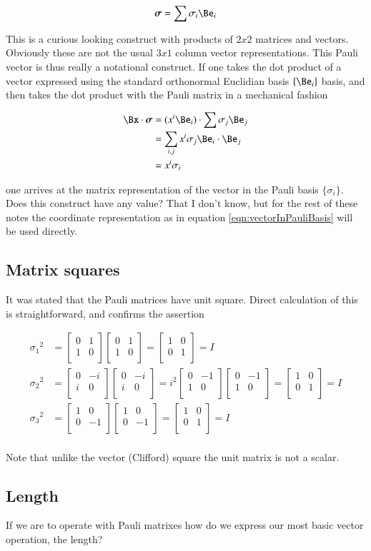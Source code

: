 \documentclass{article}
\newcommand{\PauliI}[0]{
\begin{bmatrix}
1 & 0 \\
0 & 1 \\
\end{bmatrix}
}
\newcommand{\PauliX}[0]{
\begin{bmatrix}
0 & 1 \\
1 & 0 \\
\end{bmatrix}
}
\newcommand{\PauliY}[0]{
\begin{bmatrix}
0 & -i \\
i & 0 \\
\end{bmatrix}
}
\newcommand{\PauliYNoI}[0]{
\begin{bmatrix}
0 & -1 \\
1 & 0 \\
\end{bmatrix}
}
\newcommand{\PauliZ}[0]{
\begin{bmatrix}
1 & 0 \\
0 & -1 \\
\end{bmatrix}
}
\begin{document}
\begin{align*}
\Bsigma = \sum \sigma_i \Be_i
\end{align*}

This is a curious looking construct with products of $2 x 2$ matrices and  vectors.  Obviously these are not the usual $3 x 1$ column vector representations.  This 
Pauli vector is thus 
really a notational construct.  If one takes the dot product of a vector expressed using the standard orthonormal Euclidian basis $\{\Be_i\}$ basis, and then
takes the dot product with the Pauli matrix in a mechanical fashion

\begin{align*}
\Bx \cdot \Bsigma &=
(x^i \Be_i) \cdot \sum \sigma_j \Be_j \\
&= \sum_{i,j} x^i \sigma_j \Be_i \cdot \Be_j \\
&= x^i \sigma_i \\
\end{align*}

one arrives at the matrix representation of the vector in the Pauli basis $\{\sigma_i\}$.  Does this construct have any value?  That I don't know, but for the rest of 
these notes the coordinate representation as in equation \ref{eqn:vectorInPauliBasis} will be used directly.

\subsection{ Matrix squares }

It was stated that the Pauli matrices have unit square.  Direct calculation of this
is straightforward, and confirms the assertion

\begin{align*}
{\sigma_1}^2 &= \PauliX \PauliX = \PauliI = I \\
{\sigma_2}^2 &= \PauliY \PauliY = i^2 \PauliYNoI \PauliYNoI = \PauliI = I \\
{\sigma_3}^2 &= \PauliZ \PauliZ = \PauliI = I \\
\end{align*}

Note that unlike the vector (Clifford) square the unit matrix is not a scalar.

\subsection{ Length }
If we are to
operate with Pauli matrixes how do we express our most basic vector operation,
the length?
\end{document}
